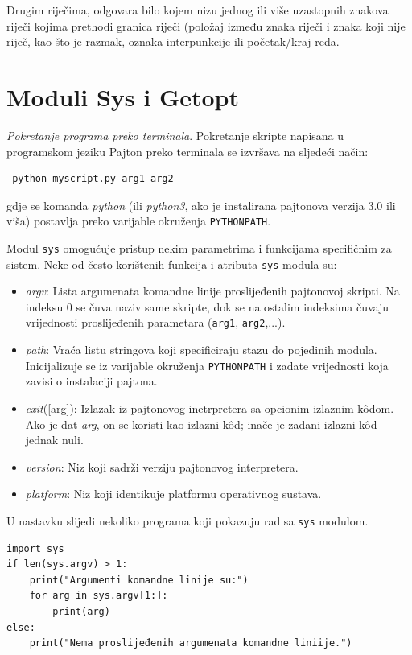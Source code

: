  Drugim riječima, odgovara bilo kojem nizu jednog ili više uzastopnih znakova riječi   kojima prethodi granica riječi (položaj između znaka riječi i znaka koji nije riječ, kao što je razmak, oznaka interpunkcije ili početak/kraj reda.
 
\section{Moduli Sys i Getopt}

\textit{Pokretanje programa preko terminala}. Pokretanje skripte napisana u progra\-mskom jeziku Pajton preko terminala se izvršava na sljedeći način:

\begin{verbatim}
 python myscript.py arg1 arg2
\end{verbatim}
gdje se komanda \emph{python} (ili \textit{python3},  ako je instalirana pajtonova verzija 3.0 ili viša) postavlja preko  varijable okruženja \texttt{PYTHONPATH}. 

 Modul \texttt{sys} omogućuje pristup nekim parametrima i funkcijama specifičnim za sistem. Neke od često korištenih funkcija i atributa \texttt{sys} modula su:

\begin{itemize}
	\item \textit{argv}: Lista argumenata komandne linije proslijeđenih pajtonovoj skripti. Na indeksu 0 se čuva naziv same skripte, dok se na ostalim indeksima čuvaju vrijednosti proslijeđenih parametara (\texttt{arg1}, \texttt{arg2},...). 
     \item \textit{path}: Vraća listu stringova koji specificiraju stazu do pojedinih modula. Inicijalizuje se iz varijable okruženja \texttt{PYTHONPATH} i zadate vrijednosti koja zavisi o instalaciji pajtona.
     \item \textit{exit}([arg]): Izlazak iz pajtonovog inetrpretera sa opcionim izlaznim k\^odom. Ako je dat \textit{arg}, on se koristi kao izlazni k\^od; inače je zadani izlazni k\^od jednak nuli.
     \item \textit{version}: Niz koji sadrži verziju pajtonovog interpretera.
     \item \textit{platform}: Niz koji identikuje platformu operativnog sustava.
\end{itemize}

U nastavku slijedi nekoliko programa koji pokazuju rad sa \texttt{sys} modulom. 

\begin{verbatim}
import sys
if len(sys.argv) > 1:
    print("Argumenti komandne linije su:")
    for arg in sys.argv[1:]:
        print(arg)
else:
    print("Nema proslijeđenih argumenata komandne liniije.")
\end{verbatim}

